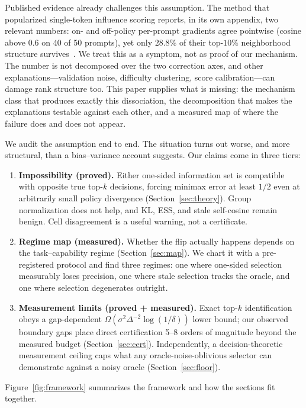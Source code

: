 \documentclass[11pt]{article}
\begin{document}
Published evidence already challenges this assumption. The method that
popularized single-token influence scoring reports, in its own appendix, two
relevant numbers: on- and off-policy per-prompt gradients agree
pointwise (cosine above $0.6$ on 40 of 50 prompts), yet only $28.8\%$ of
their top-$10\%$ neighborhood structure survives~\citep{cropi}. We treat this
as a symptom, not as proof of our mechanism. The number is not decomposed
over the two correction axes, and other explanations---validation noise,
difficulty clustering, score calibration---can damage rank structure too.
This paper supplies what is missing: the mechanism class that produces
exactly this dissociation, the decomposition that makes the explanations
testable against each other, and a measured map of where the failure does
and does not appear.

We audit the assumption end to end. The situation turns out worse, and more
structural, than a bias--variance account suggests. Our claims come in three
tiers:

\begin{enumerate}
\item \textbf{Impossibility (proved).} Either one-sided information set is
compatible with opposite true top-$k$ decisions, forcing minimax error at
least $1/2$ even at arbitrarily small policy divergence
(Section~\ref{sec:theory}). Group normalization does not help, and KL, ESS,
and stale self-cosine remain benign. Cell disagreement is a useful warning,
not a certificate.
\item \textbf{Regime map (measured).} Whether the flip actually happens
depends on the task--capability regime (Section~\ref{sec:map}). We chart it
with a pre-registered protocol and find three regimes: one where one-sided
selection measurably loses precision, one where stale selection tracks the
oracle, and one where selection degenerates outright.
\item \textbf{Measurement limits (proved + measured).} Exact top-$k$
identification obeys a gap-dependent $\Omega(\sigma^2\Delta^{-2}
\log(1/\delta))$ lower bound; our observed boundary gaps place direct
certification 5--8 orders of magnitude beyond the measured budget
(Section~\ref{sec:cert}). Independently, a decision-theoretic measurement
ceiling caps what any oracle-noise-oblivious selector can demonstrate against
a noisy oracle (Section~\ref{sec:floor}).
\end{enumerate}

Figure~\ref{fig:framework} summarizes the framework and how the sections fit
together.
\end{document}
